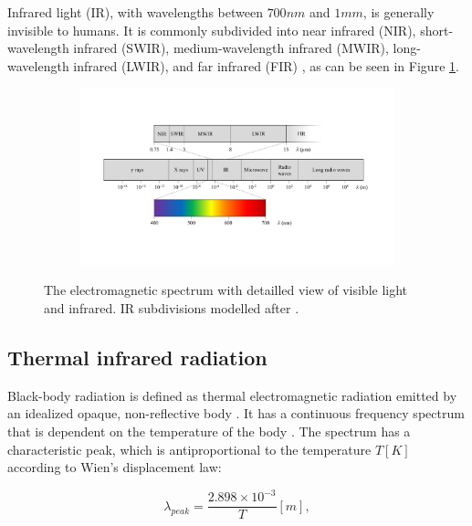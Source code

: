 \documentclass{l4proj}
\begin{document}
Infrared light (IR), with wavelengths between $700 nm$ and $1 mm$, is generally invisible to humans. It is commonly subdivided into near infrared (NIR), short-wavelength infrared (SWIR), medium-wavelength infrared (MWIR), long-wavelength infrared (LWIR), and far infrared (FIR) \citep[p. 28]{byrnes_unexploded_2008}, as can be seen in Figure \ref{fig:em_spectrum}.

\begin{figure}[ht]
  \centering
  \begin{subfigure}[h!]{0.8\textwidth}
    \includegraphics[width=\textwidth, trim={1.5cm 4cm 2cm 4cm}, clip=true]{images/EM_spectrum.pdf}
  \end{subfigure}
  \caption{The electromagnetic spectrum with detailled view of visible light and infrared. IR subdivisions modelled after \citet[p. 28]{byrnes_unexploded_2008}.}
  \label{fig:em_spectrum}
\end{figure}

\subsection{Thermal infrared radiation}

Black-body radiation is defined as thermal electromagnetic radiation emitted by an idealized opaque, non-reflective body \citep{young_sears_2012}. It has a continuous frequency spectrum that is dependent on the temperature of the body \citep{kogure_thermodynamic_2007}. The spectrum has a characteristic peak, which is antiproportional to the temperature $T [K]$ according to Wien's displacement law:

\begin{equation}
  \lambda_{peak} = \frac{2.898 \times 10^{-3}}{T} [m],
\end{equation}
\end{document}
